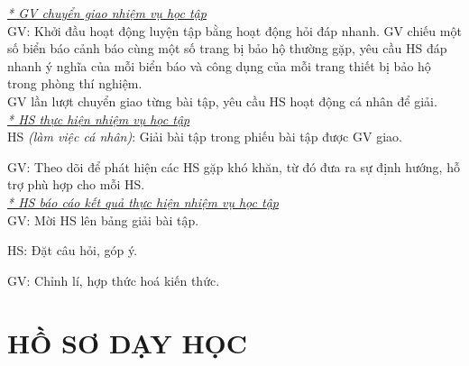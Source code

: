 {\textit{\underline{* GV chuyển giao nhiệm vụ học tập}}\\
	GV: Khởi đầu hoạt động luyện tập bằng hoạt động hỏi đáp nhanh. GV chiếu một số biển báo cảnh báo cùng một số trang bị bảo hộ thường gặp, yêu cầu HS đáp nhanh ý nghĩa của mỗi biển báo và công dụng của mỗi trang thiết bị bảo hộ trong phòng thí nghiệm.\\
	GV lần lượt chuyển giao từng bài tập, yêu cầu HS hoạt động cá nhân để giải.\\
	\textit{\underline{* HS thực hiện nhiệm vụ học tập}}\\
	HS \textit{(làm việc cá nhân)}:  Giải bài tập trong phiếu bài tập được GV giao. 
	
	GV: Theo dõi để phát hiện các HS gặp khó khăn, từ đó đưa ra sự định hướng, hỗ trợ phù hợp cho mỗi HS.\\
	\textit{\underline{* HS báo cáo kết quả thực hiện nhiệm vụ học tập}}\\
	GV: Mời HS lên bảng giải bài tập.
	
	HS: Đặt câu hỏi, góp ý.
	
	GV: Chỉnh lí, hợp thức hoá kiến thức.

}
\section{HỒ SƠ DẠY HỌC}
